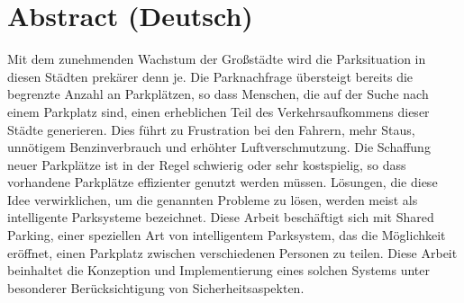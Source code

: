 \section*{Abstract (Deutsch)}
Mit dem zunehmenden Wachstum der Großstädte wird die Parksituation in diesen Städten prekärer denn je. Die Parknachfrage übersteigt bereits die begrenzte Anzahl an Parkplätzen, so dass Menschen, die auf der Suche nach einem Parkplatz sind, einen erheblichen Teil des Verkehrsaufkommens dieser Städte generieren. Dies führt zu Frustration bei den Fahrern, mehr Staus, unnötigem Benzinverbrauch und erhöhter Luftverschmutzung. Die Schaffung neuer Parkplätze ist in der Regel schwierig oder sehr kostspielig, so dass vorhandene Parkplätze effizienter genutzt werden müssen. Lösungen, die diese Idee verwirklichen, um die genannten Probleme zu lösen, werden meist als intelligente Parksysteme bezeichnet. Diese Arbeit beschäftigt sich mit Shared Parking, einer speziellen Art von intelligentem Parksystem, das die Möglichkeit eröffnet, einen Parkplatz zwischen verschiedenen Personen zu teilen. Diese Arbeit beinhaltet die Konzeption und Implementierung eines solchen Systems unter besonderer Berücksichtigung von Sicherheitsaspekten.
